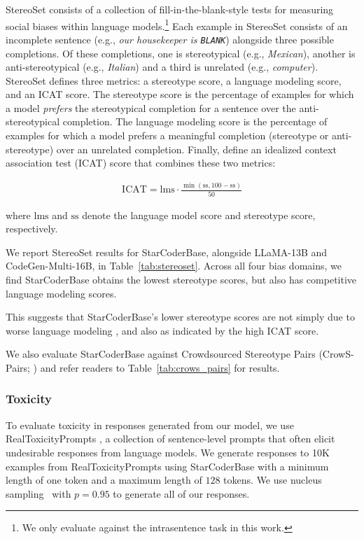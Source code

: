 StereoSet consists of a collection of fill-in-the-blank-style tests for measuring social biases within language models.\footnote{We only evaluate against the intrasentence task in this work.} Each example in StereoSet consists of an incomplete sentence (e.g., \emph{our housekeeper is \texttt{BLANK}}) alongside three possible completions. Of these completions, one is stereotypical (e.g., \emph{Mexican}), another is anti-stereotypical (e.g., \emph{Italian}) and a third is unrelated (e.g., \emph{computer}).
StereoSet defines three metrics: a stereotype score, a language modeling score, and an ICAT score. The stereotype score is the percentage of examples for which a model \emph{prefers} the stereotypical completion for a sentence over the anti-stereotypical completion. The language modeling score is the percentage of examples for which a model prefers a meaningful completion (stereotype or anti-stereotype) over an unrelated completion. Finally, \citet{nadeem_stereoset_2021} define an idealized context association test (ICAT) score that combines these two metrics:

\begin{align}
 \mathrm{ICAT} = \mathrm{lms} \cdot \frac{\min(\mathrm{ss}, 100 - \mathrm{ss})}{50}
\end{align}

where $\mathrm{lms}$ and $\mathrm{ss}$  denote the language model score and stereotype score, respectively.

We report StereoSet results for StarCoderBase, alongside LLaMA-13B and CodeGen-Multi-16B, in Table~\ref{tab:stereoset}.
Across all four bias domains, we find StarCoderBase obtains the lowest stereotype scores, but also has competitive language modeling scores. 

This suggests that StarCoderBase's lower stereotype scores are not simply due to worse language modeling \citep{meade_empirical_2022}, and also as indicated by the high ICAT score.

We also evaluate StarCoderBase against Crowdsourced Stereotype Pairs (CrowS-Pairs; \citealt{nangia_crows-pairs_2020}) and refer readers to Table~\ref{tab:crows_pairs} for results.

\subsubsection{Toxicity}\label{sec:toxicty}
To evaluate toxicity in responses generated from our model, we use RealToxicityPrompts \citep{gehman_realtoxicityprompts_2020}, a collection of sentence-level prompts that often elicit undesirable responses from language models. We generate responses to 10K examples from RealToxicityPrompts using StarCoderBase with a minimum length of one token and a maximum length of $128$ tokens. We use nucleus sampling~\citep{holtzman2020curious} with $p = 0.95$ to generate all of our responses.

